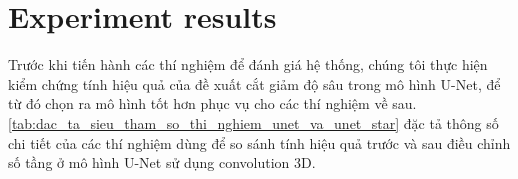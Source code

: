 \section{Experiment results} 
\label{sec:exp_results}
	Trước khi tiến hành các thí nghiệm để đánh giá hệ thống, chúng tôi thực hiện kiểm chứng tính hiệu quả của đề xuất cắt giảm độ sâu trong mô hình U-Net, để từ đó chọn ra mô hình tốt hơn phục vụ cho các thí nghiệm về sau. \autoref{tab:dac_ta_sieu_tham_so_thi_nghiem_unet_va_unet_star} đặc tả thông số chi tiết của các thí nghiệm dùng để so sánh tính hiệu quả trước và sau điều chỉnh số tầng ở mô hình U-Net sử dụng convolution 3D.
	\begin{table}[h!]
		\caption{Thông số các thí nghiệm so sánh tính hiệu quả trước và sau điều chỉnh số tầng ở mô hình U-Net sử dụng convolution 3D.}
		\label{tab:dac_ta_sieu_tham_so_thi_nghiem_unet_va_unet_star}
	\end{table}

